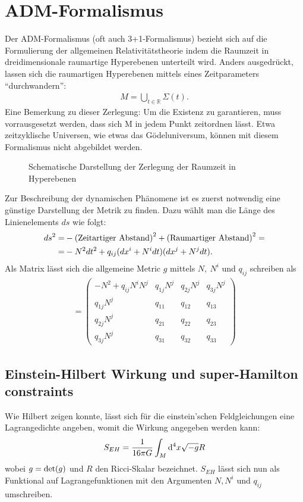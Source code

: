 \documentclass{scrartcl}
\begin{document}
	\section{ADM-Formalismus}
		Der ADM-Formalismus\cite{2008GReGr..40.1997A, gourgoulhon20123+1} (oft auch 3+1-Formalismus) bezieht sich auf die Formulierung der allgemeinen Relativitätstheorie
		indem die Raumzeit in dreidimensionale raumartige Hyperebenen unterteilt wird. Anders ausgedrückt, lassen sich die
		raumartigen Hyperebenen mittels eines Zeitparameters ``durchwandern'':
		\begin{align}
			M=\bigcup_{t\in\mathbb{R}} \Sigma(t).
		\end{align}
		Eine Bemerkung zu dieser Zerlegung: Um die Existenz zu garantieren, muss vorrausgesetzt werden, dass sich M in jedem
		Punkt zeitordnen lässt. Etwa zeitzyklische Universen, wie etwas das G\"odeluniversum, können mit diesem Formalismus nicht
		abgebildet werden.
		\begin{figure}
			\centering
			
			\caption{Schematische Darstellung der Zerlegung der Raumzeit in Hyperebenen}
		\end{figure}
		
		Zur Beschreibung der dynamischen Phänomene ist es zuerst notwendig eine günstige Darstellung der Metrik
		zu finden. Dazu wählt man die Länge des Linienelements $ds$ wie folgt:
		\begin{align}
			ds^2=&-{\rm (Zeitartiger\ Abstand)}^2+{\rm (Raumartiger\ Abstand)}^2=\notag\\
			=&-N^2 dt^2+q_{ij}(dx^i+N^i dt)(dx^j+N^j dt).
		\end{align}
		Als Matrix lässt sich die allgemeine Metric $g$ mittels $N,\ N^i$ und $q_{ij}$ schreiben als
		\begin{align}
			[g]=\left(
			\begin{array}{cccc}
				-N^2+q_{ij}N^i N^j & q_{1j}N^j & q_{2j}N^j & q_{3j}N^j \\
				q_{1j}N^j & q_{11} & q_{12} & q_{13}\\
				q_{2j}N^j & q_{21} & q_{22} & q_{23}\\
				q_{3j}N^j & q_{31} & q_{32} & q_{33}
			\end{array}\right)
			\label{equ:gmatrix}
		\end{align}
	\subsection{Einstein-Hilbert Wirkung und super-Hamilton constraints}
		Wie Hilbert zeigen konnte, lässt sich für die einstein'schen Feldgleichungen eine Lagrangedichte
		angeben, womit die Wirkung angegeben werden kann:
		\begin{align}
			S_{EH}=\frac{1}{16\pi G}\int_M{\rm d}^4x \sqrt{-g}R
		\end{align}
		wobei $g= {\rm det}(g)$ und $R$ den Ricci-Skalar bezeichnet.
		$S_{EH}$ lässt sich nun als Funktional auf Lagrangefunktionen mit den Argumenten $N,N^i$ und $q_{ij}$ umschreiben.
		
\end{document}
